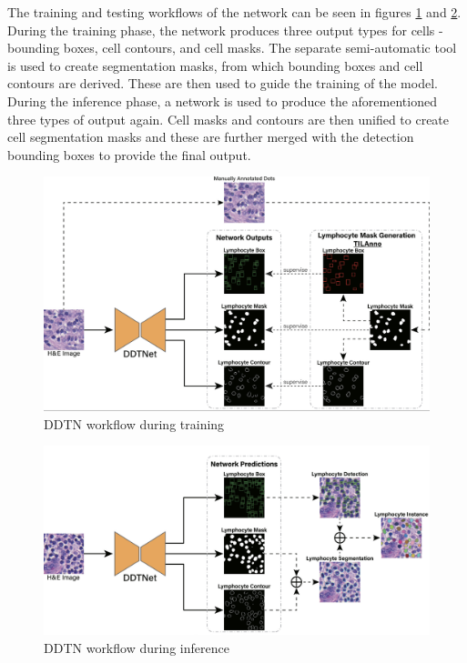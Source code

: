 The training and testing workflows of the network can be seen in figures \ref{fig:rw-ddtn-train} and \ref{fig:rw-ddtn-test}. During the training phase, the network produces three output types for cells - bounding boxes, cell contours, and cell masks. The separate semi-automatic tool is used to create segmentation masks, from which bounding boxes and cell contours are derived. These are then used to guide the training of the model. During the inference phase, a network is used to produce the aforementioned three types of output again. Cell masks and contours are then unified to create cell segmentation masks and these are further merged with the detection bounding boxes to provide the final output.

\begin{figure}[H]
    \begin{centering}
    \includegraphics[width=12cm]{assets/images/rw-ddtn-train.png}
    \par\end{centering}
    \caption{DDTN workflow during training}
    \label{fig:rw-ddtn-train}
\end{figure}

\begin{figure}[H]
    \begin{centering}
    \includegraphics[width=12cm]{assets/images/rw-ddtn-test.png}
    \par\end{centering}
    \caption{DDTN workflow during inference}
    \label{fig:rw-ddtn-test}
\end{figure}

